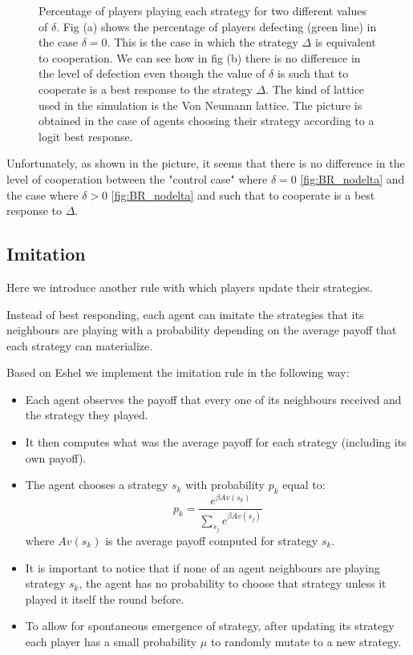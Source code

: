 \documentclass{article}
\begin{document}
\begin{figure}[htbp]
\begin{subfigure}[t]{0.47\textwidth}
  \label{fig:BR_delta} 
\end{subfigure}
\caption{Percentage of players playing each strategy for two different values of $\delta$.
Fig (a) shows the percentage of players defecting (green line) in the case $\delta =0$. This is the case in which the strategy $\Delta$ is equivalent to cooperation.
We can see how in fig (b) there is no difference in the level of defection even though the value of $\delta$ is such that to cooperate is a best response to the strategy $\Delta$.
The kind of lattice used in the simulation is the Von Neumann lattice.
The picture is obtained in the case of agents choosing their strategy according to a logit best response.
}
\label{fig:BR}
\end{figure} 

Unfortunately, as shown in the picture, it seems that there is no difference in the level of cooperation between the "control case" where $\delta=0$ \ref{fig:BR_nodelta} and the case where $\delta>0$  \ref{fig:BR_nodelta} and such that to cooperate is a best response to $\Delta$.

\subsection{Imitation}
Here we introduce another rule with which players update their strategies.

Instead of best responding, each agent can imitate the strategies that its neighbours are playing with a probability depending on the average payoff that each strategy can materialize.

Based on Eshel \cite{Eshel1998} we implement the  imitation rule in the following way:
\begin{itemize}
\item Each agent observes the payoff that every one of its neighbours received and the strategy they played.

\item It then computes what was the average payoff for each strategy (including its own payoff).

\item The agent chooses a strategy $s_k$ with probability $p_k$ equal to:
$$
p_{k}=\frac{e^{\beta Av\left(s_{k}\right)}}{\sum_{s_{j}}e^{\beta Av\left(s_{j}\right)}}
$$
where $Av\left(s_{k}\right)$ is the average payoff computed for strategy $s_k$.

\item It is important to notice that if none of an agent neighbours are playing strategy $s_k$, the agent has no probability to choose that strategy unless it played it itself the round before.

\item To allow for spontaneous emergence of strategy, after updating its strategy each player has a small probability $\mu$ to randomly mutate to a new strategy.
\end{itemize}
\end{document}
